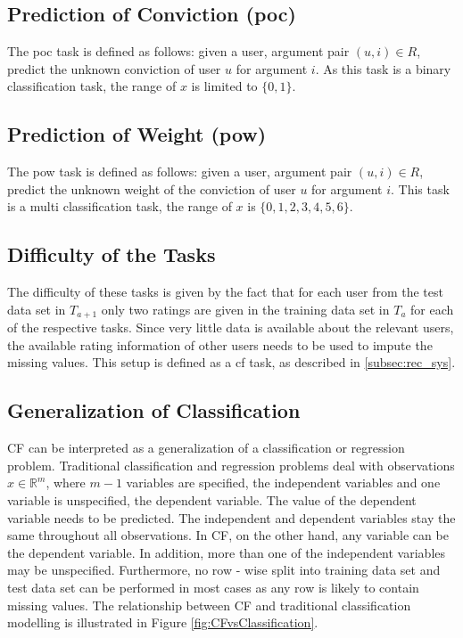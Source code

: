 \subsection{Prediction of Conviction (\acrshort{poc})}
The \acrshort{poc} task is defined as follows: given a user, argument pair $(u,i) \in R$, predict the unknown conviction of user $u$ for argument $i$. As this task is a binary classification task, the range of $x$ is limited to $\{0, 1\}$.\\
\subsection{Prediction of Weight (\acrshort{pow})}
The \acrshort{pow} task is defined as follows: given a user, argument pair $(u,i) \in R$, predict the unknown weight of the conviction of user $u$ for argument $i$. This task is a multi classification task, the range of $x$ is $\{0, 1, 2, 3, 4, 5, 6\}$.\\
\subsection{Difficulty of the Tasks}
\label{sec:difficulty}
The difficulty of these tasks is given by the fact that for each user from the test data set in $T_{a+1}$  only two ratings are given in the training data set in $T_{a}$ for each of the respective tasks. Since very little data is available about the relevant users, the available rating information of other users needs to be used to impute the missing values. This setup is defined as a \acrshort{cf} task, as described in \ref{subsec:rec_sys}.\\
\subsection{Generalization of Classification}
CF can be interpreted as a generalization of a classification or regression problem. Traditional classification and regression problems deal with observations $x \in \mathbb{R}^{m}$, where $m - 1$ variables are specified, the independent variables and one variable is unspecified, the dependent variable. The value of the dependent variable needs to be predicted. The independent and dependent variables stay the same throughout all observations. In CF, on the other hand, any variable can be the dependent variable. In addition, more than one of the independent variables may be unspecified. Furthermore, no row - wise split into training data set and test data set can be performed in most cases as any row is likely to contain missing values. The relationship between CF and traditional classification modelling is illustrated in Figure \ref{fig:CFvsClassification}.

